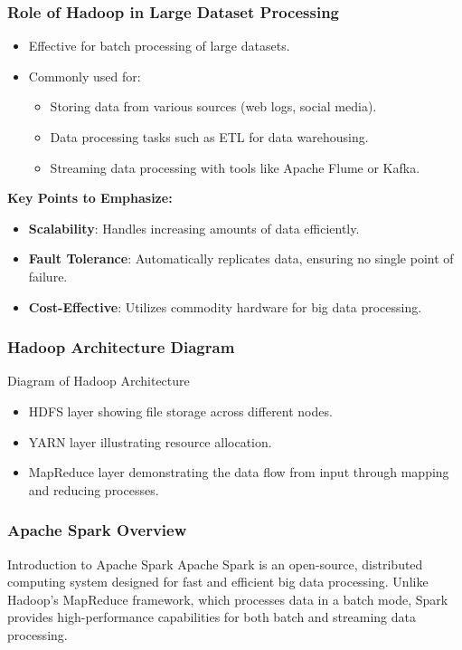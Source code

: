 \documentclass[aspectratio=169]{beamer}
\begin{document}
\begin{frame}[fragile]
    \frametitle{Role of Hadoop in Large Dataset Processing}
    \begin{itemize}
        \item Effective for batch processing of large datasets.
        \item Commonly used for:
        \begin{itemize}
            \item Storing data from various sources (web logs, social media).
            \item Data processing tasks such as ETL for data warehousing.
            \item Streaming data processing with tools like Apache Flume or Kafka.
        \end{itemize}
    \end{itemize}
    
    \textbf{Key Points to Emphasize:}
    \begin{itemize}
        \item \textbf{Scalability}: Handles increasing amounts of data efficiently.
        \item \textbf{Fault Tolerance}: Automatically replicates data, ensuring no single point of failure.
        \item \textbf{Cost-Effective}: Utilizes commodity hardware for big data processing.
    \end{itemize}
\end{frame}

\begin{frame}[fragile]
    \frametitle{Hadoop Architecture Diagram}
    \begin{block}{Diagram of Hadoop Architecture}
        \begin{itemize}
            \item HDFS layer showing file storage across different nodes.
            \item YARN layer illustrating resource allocation.
            \item MapReduce layer demonstrating the data flow from input through mapping and reducing processes.
        \end{itemize}
    \end{block}
\end{frame}

\begin{frame}[fragile]
    \frametitle{Apache Spark Overview}
    \begin{block}{Introduction to Apache Spark}
        Apache Spark is an open-source, distributed computing system designed for fast and efficient big data processing. Unlike Hadoop’s MapReduce framework, which processes data in a batch mode, Spark provides high-performance capabilities for both batch and streaming data processing.
    \end{block}
\end{frame}
\end{document}
